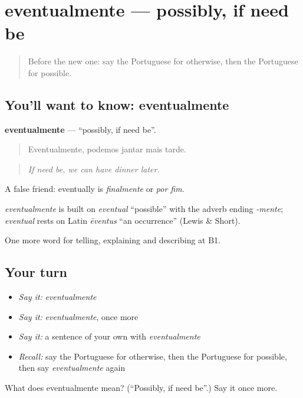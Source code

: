 \section[eventualmente]{eventualmente — possibly, if need be}

\label{lesson:PT-C370-eventualmente}



\begin{quote}
Before the new one: say the Portuguese for otherwise, then the Portuguese for possible.
\end{quote}

\subsection*{You'll want to know: eventualmente}
\textbf{eventualmente} — \textquotedblleft{}possibly, if need be\textquotedblright{}.

\begin{quote}
Eventualmente, podemos jantar mais tarde.
\end{quote}

\begin{quote}
\emph{If need be, we can have dinner later.}
\end{quote}

A false friend: eventually is \emph{finalmente} or \emph{por fim}.

\begin{cousinweb}
\emph{eventualmente} is built on \emph{eventual} \textquotedblleft{}possible\textquotedblright{} with the adverb ending \emph{-mente}; \emph{eventual} rests on Latin \emph{ēventus} \textquotedblleft{}an occurrence\textquotedblright{} (Lewis \& Short).
\end{cousinweb}

\begin{grammarlens}[title={What you've built}]
One more word for telling, explaining and describing at B1.
\end{grammarlens}

\subsection*{Your turn}
\begin{itemize}
\raggedright
  \item \emph{Say it:} \emph{eventualmente}
  \item \emph{Say it:} \emph{eventualmente}, once more
  \item \emph{Say it:} a sentence of your own with \emph{eventualmente}
  \item \emph{Recall:} say the Portuguese for otherwise, then the Portuguese for possible, then say \emph{eventualmente} again
\end{itemize}

\begin{tcolorbox}[breakable,colback=teal!4,colframe=teal!35!black,title={Before you move on}]
What does eventualmente mean? (\textquotedblleft{}Possibly, if need be\textquotedblright{}.) Say it once more.
\end{tcolorbox}
